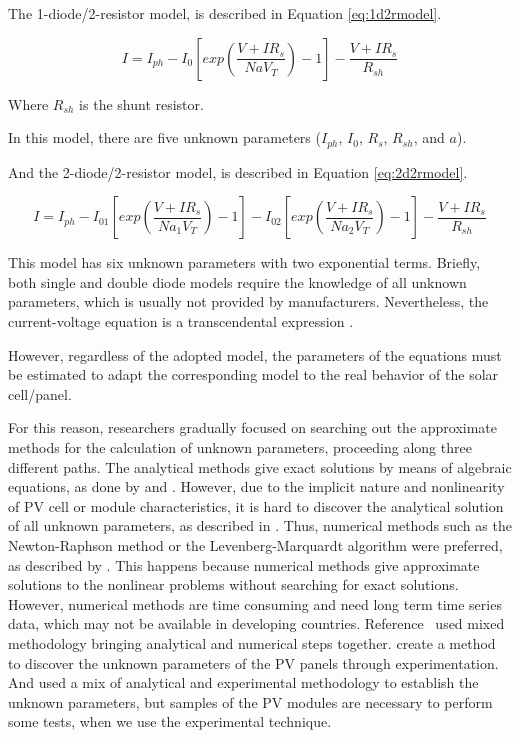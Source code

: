 The 1-diode/2-resistor model, is described in Equation \ref{eq:1d2rmodel}. 

\begin{equation}
\label{eq:1d2rmodel}
I =I_{ph}-I_{0}\left[ exp \left( \dfrac{V+IR_{s}}{NaV_{T}} \right) -1 \right] - \dfrac{V+IR_{s}}{R_{sh}}
\end{equation}

Where $R_{sh}$ is the shunt resistor.

In this model, there are five unknown parameters ($ I_{ph}$, $I_{0}$, $ R_{s} $, $ R_{sh} $, and $ a $).

And the 2-diode/2-resistor model, is described in Equation \ref{eq:2d2rmodel}. 

\begin{equation}
\label{eq:2d2rmodel}
I =I_{ph}-I_{01}\left[ exp \left( \dfrac{V+IR_{s}}{Na_{1}V_{T}} \right) -1 \right] - I_{02}\left[ exp \left( \dfrac{V+IR_{s}}{Na_{2}V_{T}} \right) -1 \right] - \dfrac{V+IR_{s}}{R_{sh}}
\end{equation}

This model has six unknown parameters with two exponential terms. 
Briefly, both single and double diode models require the knowledge of all unknown parameters, which is usually not provided by manufacturers. Nevertheless, the current-voltage equation is a transcendental expression \cite{Jakhrani}.  

However, regardless of the adopted model, the parameters of the equations must be estimated to adapt the corresponding model to the real behavior of the solar cell/panel. 

For this reason, researchers gradually focused on searching out the approximate methods for the calculation of unknown parameters, proceeding along three different paths. The analytical methods give exact solutions by means of algebraic equations, as done by \cite{Cubas} and \cite{Brano}. However, due to the implicit nature and nonlinearity of PV cell or module characteristics, it is hard to discover the analytical solution of all unknown parameters, as described in \cite{Hasan}. Thus, numerical methods such as the Newton-Raphson method or the Levenberg-Marquardt algorithm were preferred, as described by \cite{Mellit}. This happens because numerical methods give approximate solutions to the nonlinear problems without searching for exact solutions. However, numerical methods are time consuming and need long term time series data, which may not be available in developing countries. Reference~\cite{Jakhrani} used mixed methodology bringing analytical and numerical steps together.  \cite{Shenawy} create a method to discover the unknown parameters of the PV panels through experimentation. And \cite{Tian} used a mix of analytical and experimental methodology to establish the unknown parameters, but samples of the PV modules are necessary to perform some tests, when we use the experimental technique. 

